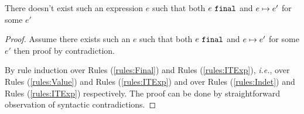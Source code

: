\begin{lem}[Finality]
  \label{lem:finality}
  There doesn't exist such an expression $e$ such that both $e ~\mathtt{final}$ and $e \mapsto e'$ for some $e'$
\end{lem}
\begin{proof}Assume there exists such an $e$ such that both $e ~\mathtt{final}$ and $e \mapsto e'$ for some $e'$ then proof by contradiction.
 
  By rule induction over Rules (\ref{rules:Final}) and Rules (\ref{rules:ITExp}), \textit{i.e.}, over Rules (\ref{rules:Value}) and Rules (\ref{rules:ITExp}) and over Rules (\ref{rules:Indet}) and Rules (\ref{rules:ITExp}) respectively. The proof can be done by straightforward observation of syntactic contradictions.
\end{proof}

